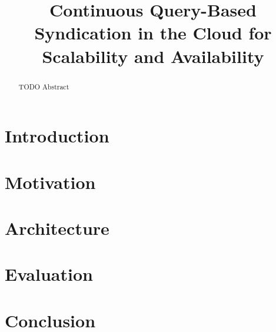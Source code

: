 \documentclass[conference]{IEEEtran}
\begin{document}
\title{Continuous Query-Based Syndication in the Cloud for Scalability and Availability}

\author{
\and
{}
}

\maketitle

\begin{abstract}
TODO Abstract
\end{abstract}

\section{Introduction} %


\section{Motivation} 


\section{Architecture} %

\section{Evaluation}

\section{Conclusion}



\end{document}
